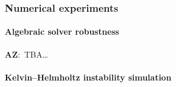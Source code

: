 \documentclass[12pt]{article}
\newcommand{\vect}[1]{\boldsymbol{\mathbf{#1}}}
\newcommand{\AZ}[1]{{\color{red}\textbf{AZ}:~#1}}
\begin{document}
%	
%	
%	

\subsubsection{Numerical experiments}

\paragraph{Algebraic solver robustness}

\AZ{TBA\dots}

\paragraph{Kelvin--Helmholtz instability simulation}
\end{document}
